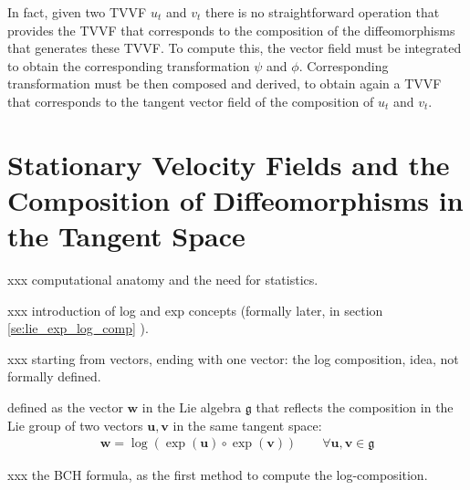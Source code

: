 In fact, given two TVVF $u_t$ and $v_t$ there is no straightforward operation that provides the TVVF that corresponds to the composition of the diffeomorphisms that generates these TVVF. To compute this, the vector field must be integrated to obtain the corresponding transformation $\psi$ and $\phi$. Corresponding transformation must be then composed and derived, to obtain again a TVVF that corresponds to the tangent vector field of the composition of $u_t$ and $v_t$.



\section{Stationary Velocity Fields and the Composition of Diffeomorphisms in the Tangent Space}


\noindent
xxx computational anatomy and the need for statistics.

\noindent
xxx introduction of log and exp concepts (formally later, in section \ref{se:lie_exp_log_comp} ).

\noindent
xxx starting from vectors, ending with one vector: the log composition, idea, not formally defined.

\noindent
defined as the vector $\mathbf{w}$ in the Lie algebra $\mathfrak{g}$ that reflects the composition in the Lie group of two vectors $\mathbf{u}, \mathbf{v}$ in the same tangent space:
\begin{align*}
\mathbf{w} = \log(\exp(\mathbf{u})\circ\exp( \mathbf{v}))
\qquad
\forall \mathbf{u}, \mathbf{v} \in \mathfrak{g}
\end{align*}


\noindent
xxx the BCH formula, as the first method to compute the log-composition.











